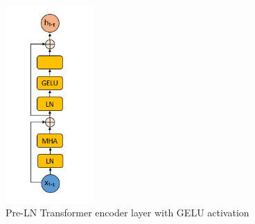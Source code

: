 \begin{figure}
	\centering
	\includegraphics[width=0.3\textwidth]{figures/ml_theory/transformer_block.png}
	\caption{Pre-LN Transformer encoder layer with GELU activation}
	\label{fig:pre_trsf}
\end{figure}
